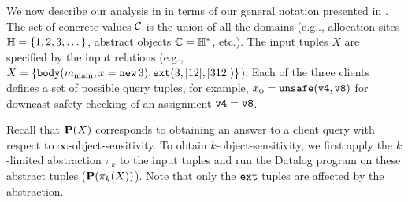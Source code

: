 
We now describe our analysis in  in terms of our general notation presented in .
The set of concrete values $\mathcal{C}$ is the union of all the domains
(e.g.., allocation sites ${\mathbb H} = \{ 1, 2, 3, \dots \}$, abstract objects ${\mathbb C} = {\mathbb H}^*$, etc.).
The input tuples $X$ are specified by the input relations
(e.g., $X = \{ \text{\tt body}(m_\text{main}, x = \text{\tt new}\,3), \text{\tt ext}(3,[12],[312]) \}$).
Each of the three clients defines a set of possible query tuples, for example,
$x_\text{\sc o} = \text{\tt unsafe}(\text{\tt v4},\text{\tt v8})$ for downcast safety checking of an assignment $\text{\tt v4} = \text{\tt v8}$.

Recall that $\mathbf{P}(X)$ corresponds to obtaining an answer to a client query with respect to $\infty$-object-sensitivity.
To obtain $k$-object-sensitivity,
we first apply the $k$-limited abstraction $\pi_k$ to the input tuples
and run the Datalog program on these abstract tuples ($\mathbf{P}(\pi_k(X))$).
Note that only the $\text{\tt ext}$ tuples are affected by the abstraction.
